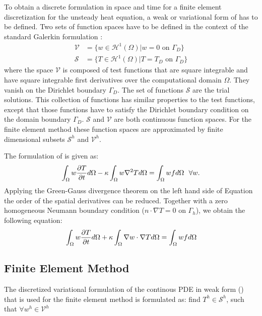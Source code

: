 To obtain a discrete formulation in space and time for a finite element discretization for the unsteady heat equation, a weak or variational form of  has to be defined. Two sets of function spaces have to be defined in the context of the standard Galerkin formulation \cite{doneaFiniteElementMethods2003}:
\begin{align}
	\mathcal{V} &= \{w \in \mathcal{H}^1(\Omega) | w = 0 \text{ on } \Gamma_D\}\\
	\mathcal{S} &= \{T \in \mathcal{H}^1(\Omega) | T = T_D \text{ on } \Gamma_D\}
\end{align}
where the space $\mathcal{V}$ is composed of test functions that are square integrable and have square integrable first derivatives over the computational domain $\Omega$. They vanish on the Dirichlet boundary $\Gamma_D$. The set of functions $\mathcal{S}$ are the trial solutions. This collection of functions has similar properties to the test functions, except that those functions have to satisfy the Dirichlet boundary condition on the domain boundary $\Gamma_D$. $\mathcal{S}$ and $\mathcal{V}$ are both continuous function spaces. For the finite element method these function spaces are approximated by finite dimensional subsets $\mathcal{S}^h$ and $\mathcal{V}^h$.

The formulation of  is given as:
\begin{equation}
	\label{eq:weak}
	\int_{\Omega} w\frac{\partial T}{\partial t} d\Omega - \kappa \int_{\Omega} w \nabla^2 T d\Omega = \int_{\Omega}w f d\Omega \ \ \forall w .
\end{equation}
Applying the Green-Gauss divergence theorem on the left hand side of Equation  the order of the spatial derivatives can be reduced. Together with a zero homogeneous Neumann boundary condition ($n \cdot \nabla T = 0 \text{ on } \Gamma_h$), we obtain the following equation:
\begin{equation}
	\label{eq:weak2}
	\int_{\Omega}w\frac{\partial T}{\partial t} d\Omega + \kappa \int_{\Omega} \nabla w \cdot \nabla T d\Omega = \int_{\Omega} w f d\Omega
\end{equation}

\subsection{Finite Element Method}

The discretized variational formulation of the continous PDE in weak form ()  that is used for the finite element method is formulated as: find $T^h \in \mathcal{S}^h$, such that $\forall w^h \in \mathcal{V}^h$

